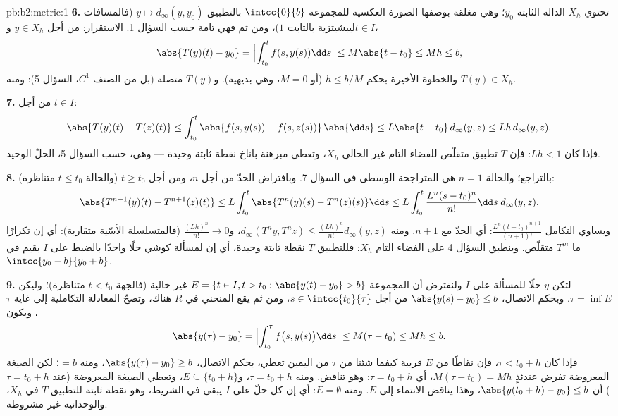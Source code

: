 \begin{solution}{pb:b2:metric:1}
\textbf{6.} تحتوي $X_h$ الدالة الثابتة $y_0$؛ وهي مغلقة بوصفها
الصورة العكسية للمجموعة $\intcc{0}{b}$ بالتطبيق  $y
\mapsto d_\infty(y, y_0)$ (فالمسافات ليبشيتزية بالثابت $1$)، ومن ثم فهي
تامة حسب السؤال 1. الاستقرار: من أجل $y \in X_h$ و$t \in
I$،
\[
\abs{T(y)(t) - y_0} = \Bigl|\int_{t_0}^{t}f(s, y(s))\dd s\Bigr|
\leq M\abs{t - t_0} \leq Mh \leq b ,
\]
والخطوة الأخيرة بحكم $h \leq b/M$ (أو $M = 0$، وهي بديهية). و$T(y)$
متصلة (بل من الصنف $C^1$، السؤال 5): ومنه $T(y) \in X_h$.

\textbf{7.} من أجل $t \in I$:
\[
\abs{T(y)(t) - T(z)(t)} \leq \int_{t_0}^{t}\abs{f(s, y(s)) -
f(s, z(s))}\,\abs{\dd s} \leq L\abs{t - t_0}\,d_\infty(y,z)
\leq Lh\,d_\infty(y,z).
\]
فإذا كان $Lh < 1$: فإن $T$ تطبيق متقلّص للفضاء التام غير الخالي
$X_h$، وتعطي مبرهنة باناخ نقطة ثابتة وحيدة --- وهي، حسب السؤال 5،
الحلّ الوحيد.

\textbf{8.} بالتراجع؛ والحالة $n = 1$ هي المتراجحة الوسطى في السؤال
7. وبافتراض الحدّ من أجل $n$، ومن أجل $t \geq t_0$ (والحالة
$t \leq t_0$ متناظرة):
\[
\abs{T^{n+1}(y)(t) - T^{n+1}(z)(t)}
\leq L\int_{t_0}^{t}\abs{T^n(y)(s) - T^n(z)(s)}\dd s
\leq L\int_{t_0}^{t}\frac{L^n(s - t_0)^n}{n!}\dd s\;
d_\infty(y,z),
\]
ويساوي التكامل $\frac{L^n(t -
t_0)^{n+1}}{(n+1)!}$: أي الحدّ مع $n + 1$. ومنه
$d_\infty(T^n y, T^n z) \leq \frac{(Lh)^n}{n!}d_\infty(y, z)$،
و$\frac{(Lh)^n}{n!} \to 0$ (فالمتسلسلة الأسّية
متقاربة): أي إن تكرارًا ما $T^m$ متقلّص. وينطبق السؤال 4 على
الفضاء التام $X_h$: فللتطبيق $T$ نقطة ثابتة وحيدة، أي إن
لمسألة كوشي حلًا واحدًا بالضبط على $I$ بقيم في
$\intcc{y_0 - b}{y_0 + b}$.

\textbf{9.} لتكن $y$ حلًا للمسألة على $I$ ولنفترض أن المجموعة
$E = \{t \in I, t > t_0 : \abs{y(t) - y_0} > b\}$ غير خالية
(فالجهة $t < t_0$ متناظرة)؛ وليكن $\tau = \inf E$. وبحكم
الاتصال، $\abs{y(s) - y_0} \leq b$ من أجل $s \in
\intcc{t_0}{\tau}$، ومن ثم يقع المنحني في $R$ هناك، وتصحّ المعادلة
التكاملية إلى غاية $\tau$، ويكون
\[
\abs{y(\tau) - y_0} = \Bigl|\int_{t_0}^{\tau}f\bigl(s,
y(s)\bigr)\dd s\Bigr| \leq M(\tau - t_0) \leq Mh \leq b .
\]
فإذا كان $\tau < t_0 + h$، فإن نقاطًا من $E$ قريبة كيفما شئنا من $\tau$
من اليمين تعطي، بحكم الاتصال، $\abs{y(\tau) - y_0} \geq
b$، ومنه $= b$؛ لكن الصيغة المعروضة تفرض عندئذٍ $M(\tau - t_0) =
Mh$، أي $\tau = t_0 + h$: وهو تناقض. ومنه $\tau = t_0 + h$،
و$E \subseteq \{t_0 + h\}$، وتعطي الصيغة المعروضة (عند $\tau = t_0 + h$)
أن $\abs{y(t_0 + h) - y_0} \leq b$، وهذا يناقض الانتماء
إلى $E$. ومنه $E = \emptyset$: أي إن كل حلّ على $I$ يبقى في
الشريط، وهو نقطة ثابتة للتطبيق $T$ في $X_h$، والوحدانية
غير مشروطة.


\end{solution}
